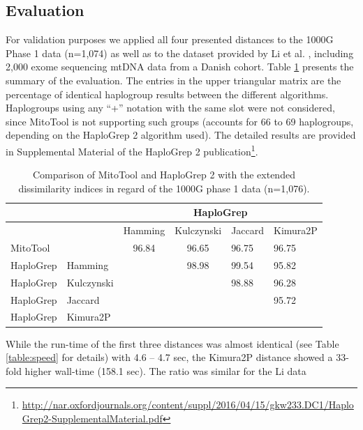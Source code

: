 \subsection{Evaluation}
\label{subs:evaluation}

For validation purposes we applied all four presented distances to the 1000G Phase 1 data (n=1,074) as well as to the dataset provided by Li et al. \cite{Li2014}, including 2,000 exome sequencing mtDNA data from a Danish cohort. Table \ref{table:distances} presents the summary of the evaluation. The entries in the upper triangular matrix are the percentage of identical haplogroup results between the different algorithms. Haplogroups using any “+” notation with the same slot were not considered, since MitoTool is not supporting such groups (accounts for 66 to 69 haplogroups, depending on the HaploGrep 2 algorithm used). The detailed results are provided in Supplemental Material of the HaploGrep 2 publication\footnote{\url{http://nar.oxfordjournals.org/content/suppl/2016/04/15/gkw233.DC1/HaploGrep2-SupplementalMaterial.pdf}}. 
\begin{table}[H]
\centering
\begin{tabular}{l|l|llll|}
\cline{3-6}
 &    & \multicolumn{4}{c|}{HaploGrep} \\ \hline
\cellcolor[HTML]{FFFFFF} & \cellcolor[HTML]{FFFFFF} & \cellcolor[HTML]{FFFFFF}Hamming & Kulczynski & Jaccard & Kimura2P \\
MitoTool & & \multicolumn{1}{c}{\cellcolor[HTML]{96FFFB}96.84} & \multicolumn{1}{c}{\cellcolor[HTML]{96FFFB}96.65} & 
\cellcolor[HTML]{96FFFB}96.75 & \cellcolor[HTML]{96FFFB}96.75 \\ \hline
HaploGrep & Hamming & \multicolumn{1}{c}{\cellcolor[HTML]{FFFFFF}{\color[HTML]{330001} }} & \multicolumn{1}{c}{\cellcolor[HTML]{A9D0FF}98.98} & \cellcolor[HTML]{34CDF9}99.54 & \cellcolor[HTML]{ECF4FF}95.82 \\
HaploGrep  & Kulczynski & & \cellcolor[HTML]{FFFFFF} & \cellcolor[HTML]{A9D0FF}98.88 & \cellcolor[HTML]{96FFFB}96.28 \\
HaploGrep & Jaccard & & & & \cellcolor[HTML]{ECF4FF}95.72 \\
HaploGrep & Kimura2P & & & & \cellcolor[HTML]{FFFFFF} \\
\end{tabular}
\caption{Comparison of MitoTool and HaploGrep 2 with the extended dissimilarity indices in regard of the 1000G phase 1 data (n=1,076).}
\label{table:distances}
\end{table}
While the run-time of the first three distances was almost identical (see Table \ref{table:speed} for details) with 4.6 – 4.7 sec, the Kimura2P distance showed a 33-fold higher wall-time (158.1 sec). The ratio was similar for the Li data
